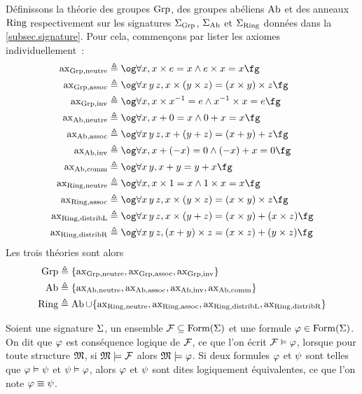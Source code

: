 \begin{example}
  Définissons la théorie des groupes $\operatorname{Grp}$, des groupes abéliens $\operatorname{Ab}$
  et des anneaux $\operatorname{Ring}$ respectivement sur les signatures
  $\Sigma_{\operatorname{Grp}}$, $\Sigma_{\operatorname{Ab}}$ et $\Sigma_{\operatorname{Ring}}$ données dans la \cref{subsec.signature}.
  Pour cela, commençons par lister les axiomes individuellement~:
  \begin{align*}
    \Rax_{\Grp,\neut} &\defeq \ogM\forall x, x \times e = x \land
    e \times x = x\fgM\\
    \Rax_{\Grp,\assoc} &\defeq \ogM\forall x\,y\,z, x \times (y \times z)
    = (x \times y) \times z\fgM\\
    \Rax_{\Grp,\inv} &\defeq \ogM\forall x, x \times x^{-1} = e \land
    x^{-1}\times x = e\fgM\\
    \Rax_{\Ab,\neut} &\defeq \ogM\forall x, x + 0 = x \land 0 + x = x\fgM\\
    \Rax_{\Ab,\assoc} &\defeq \ogM\forall x\,y\,z, x + (y + z) = (x + y) + z\fgM\\
    \Rax_{\Ab,\inv} &\defeq \ogM\forall x, x + (-x) = 0 \land (-x) + x = 0\fgM\\
    \Rax_{\Ab,\comm} &\defeq \ogM\forall x\,y, x + y = y + x\fgM\\
    \Rax_{\Ring,\neut} &\defeq \ogM\forall x, x \times 1 = x \land
    1 \times x = x\fgM\\
    \Rax_{\Ring,\assoc} &\defeq \ogM\forall x\,y\,z, x \times(y \times z) =
    (x \times y) \times z\fgM\\
    \Rax_{\Ring,\distrL} &\defeq \ogM\forall x\,y\,z,
      x \times (y + z) = (x \times y) + (x \times z)\fgM\\
    \Rax_{\Ring,\distrR} &\defeq \ogM\forall x\,y\,z,
      (x + y) \times z = (x \times z) + (y \times z)\fgM
  \end{align*}
  Les trois théories sont alors
  \begin{align*}
    \operatorname{Grp} &\triangleq \{\operatorname{ax}_{\operatorname{Grp},\operatorname{neutre}},\operatorname{ax}_{\operatorname{Grp},\operatorname{assoc}},\operatorname{ax}_{\operatorname{Grp},\operatorname{inv}}\}\\
    \operatorname{Ab} &\triangleq
    \{\operatorname{ax}_{\operatorname{Ab},\operatorname{neutre}},\operatorname{ax}_{\operatorname{Ab},\operatorname{assoc}},\operatorname{ax}_{\operatorname{Ab},\operatorname{inv}},\operatorname{ax}_{\operatorname{Ab},\operatorname{comm}}\} \\
    \operatorname{Ring} &\triangleq \operatorname{Ab} \cup
    \{\operatorname{ax}_{\operatorname{Ring},\operatorname{neutre}},\operatorname{ax}_{\operatorname{Ring},\operatorname{assoc}},\operatorname{ax}_{\operatorname{Ring},\operatorname{distribL}},\operatorname{ax}_{\operatorname{Ring},\operatorname{distribR}}\}
  \end{align*}
\end{example}

\begin{definition}
  Soient une signature $\Sigma$, un ensemble
  $\mathcal F\subseteq \operatorname{Form}(\Sigma)$ et une formule
  $\varphi\in\operatorname{Form}(\Sigma)$. On dit que $\varphi$ est conséquence logique de
  $\mathcal F$, ce que l'on écrit $\mathcal F \vDash \varphi$, lorsque pour toute
  structure $\mathfrak{M}$, si $\mathfrak{M}\models \mathcal F$ alors
  $\mathfrak{M}\models \varphi$. Si deux formules $\varphi$ et $\psi$ sont telles que
  $\varphi\vDash \psi$ et $\psi\vDash \varphi$,
  alors $\varphi$ et $\psi$ sont dites logiquement
  équivalentes, ce que l'on note $\varphi\equiv\psi$.
\end{definition}

